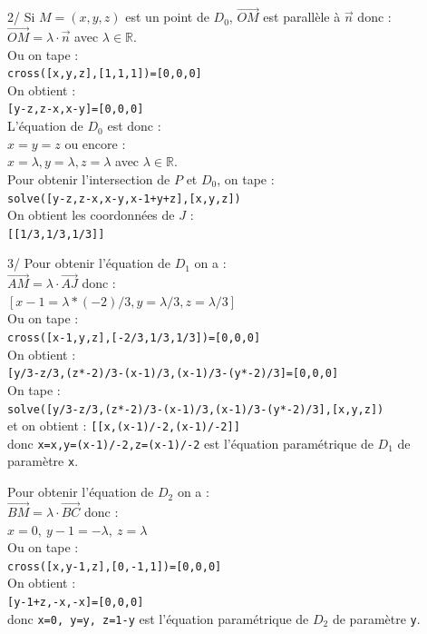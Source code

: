 \documentclass[a4paper,11pt]{book}
\begin{document}
2/ Si $M=(x,y,z)$ est un point de $D_0$, $\overrightarrow{OM}$ est parall\`ele
\`a $\overrightarrow n$ donc :\\
$\overrightarrow{OM}=\lambda \cdot \overrightarrow n$ 
avec $\lambda \in \mathbb R$.\\
Ou on tape :\\
{\tt cross([x,y,z],[1,1,1])=[0,0,0]}\\
On obtient :\\
{\tt [y-z,z-x,x-y]=[0,0,0]}\\
L'\'equation de $D_0$ est donc : \\
$x=y=z$ ou encore :\\
$x=\lambda,y=\lambda,z=\lambda$ avec $\lambda \in \mathbb R$.\\
Pour obtenir l'intersection de $P$ et $D_0$, on tape :\\
{\tt solve([y-z,z-x,x-y,x-1+y+z],[x,y,z])}\\
On obtient les coordonn\'ees de $J$ :\\
{\tt [[1/3,1/3,1/3]]}

3/ Pour obtenir l'\'equation de $D_1$ on a :\\
$\overrightarrow{AM}=\lambda \cdot\overrightarrow{AJ}$ donc :\\
$[x-1=\lambda*(-2)/3,y=\lambda/3,z=\lambda/3]$\\
Ou on tape :\\
{\tt cross([x-1,y,z],[-2/3,1/3,1/3])=[0,0,0]}\\
On obtient :\\
{\tt [y/3-z/3,(z*-2)/3-(x-1)/3,(x-1)/3-(y*-2)/3]=[0,0,0]}\\
On tape :\\
{\tt solve([y/3-z/3,(z*-2)/3-(x-1)/3,(x-1)/3-(y*-2)/3],[x,y,z])}\\
et on obtient : {\tt [[x,(x-1)/-2,(x-1)/-2]]}\\
donc {\tt x=x,y=(x-1)/-2,z=(x-1)/-2} est l'\'equation param\'etrique de $D_1$ 
de param\`etre {\tt x}.

Pour obtenir l'\'equation de $D_2$ on a :\\
$\overrightarrow{BM}=\lambda \cdot\overrightarrow{BC}$ donc :\\
$x=0,\ y-1=-\lambda,\ z=\lambda$\\
Ou on tape :\\
{\tt cross([x,y-1,z],[0,-1,1])=[0,0,0]}\\
On obtient :\\
{\tt [y-1+z,-x,-x]=[0,0,0]}\\
donc {\tt x=0, y=y, z=1-y} est l'\'equation param\'etrique de $D_2$ de 
param\`etre {\tt y}.
\end{document}
